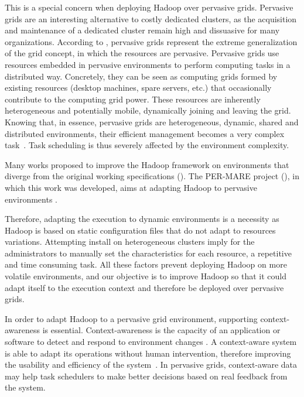 This is a special concern when deploying Hadoop over pervasive grids. Pervasive grids are an interesting alternative to costly dedicated clusters, as the acquisition and maintenance of a dedicated cluster remain high and dissuasive for many organizations. According to \cite{Parashar2010}, pervasive grids represent the extreme generalization of the grid concept, in which the resources are pervasive. Pervasive grids use resources embedded in pervasive environments to perform computing tasks in a distributed way. Concretely, they can be seen as computing grids formed by existing resources (desktop machines, spare servers, etc.) that occasionally contribute to the computing grid power. These resources are inherently heterogeneous and potentially mobile, dynamically joining and leaving the grid. Knowing that, in essence, pervasive grids are heterogeneous, dynamic, shared and distributed environments, their efficient management becomes a very complex task~\cite{Nascimento}. Task scheduling is thus severely affected by the environment complexity.  

Many works proposed to improve the Hadoop framework on environments that diverge from the original working specifications (\cite{Kumar2012, Zaharia2008, Rasooli2012, Sandholm2010}). The PER-MARE project (\cite{PER-MARE}), in which this work was developed, aims at adapting Hadoop to pervasive environments \cite{3PGCIC}.

Therefore, adapting the execution to dynamic environments is a necessity as Hadoop is based on static configuration files that do not adapt to resources variations. Attempting install on heterogeneous clusters imply for the administrators to manually set the characteristics for each resource, a repetitive and time consuming task. All these factors prevent deploying Hadoop on more volatile environments, and our objective is to improve Hadoop so that it could adapt itself to the execution context and therefore be deployed over pervasive grids.

In order to adapt Hadoop to a pervasive grid environment, supporting context-awareness is essential. Context-awareness is the capacity of an application or software to detect and respond to environment changes \cite{Maamar}. A context-aware system is able to adapt its operations without human intervention, therefore improving the usability and efficiency of the system~\cite{Baldauf}. In pervasive grids, context-aware data may help task schedulers to make better decisions based on real feedback from the system.

